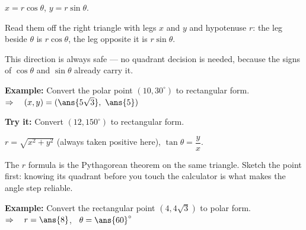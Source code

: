 \documentclass[12pt]{article}
\begin{document}


\begin{formulabox}
$x = r\cos\theta$, \qquad $y = r\sin\theta$.\par
Read them off the right triangle with legs $x$ and $y$ and hypotenuse $r$: the leg beside $\theta$ is $r\cos\theta$, the leg opposite it is $r\sin\theta$.\par
This direction is always safe --- no quadrant decision is needed, because the signs of $\cos\theta$ and $\sin\theta$ already carry it.
\end{formulabox}

\begin{examplebox}
\textbf{Example:} \quad Convert the polar point $(10, 30^\circ)$ to rectangular form.
$\Rightarrow\quad (x, y) = (\ans{5\sqrt{3}},\ \ans{5})$
\end{examplebox}

\begin{tryitbox}
\textbf{Try it:} \quad Convert $(12, 150^\circ)$ to rectangular form.\\[2pt]
\end{tryitbox}


\begin{formulabox}
$r = \sqrt{x^2 + y^2}$ \quad (always taken positive here), \qquad $\tan\theta = \dfrac{y}{x}$.\par
The $r$ formula is the Pythagorean theorem on the same triangle. Sketch the point first: knowing its quadrant before you touch the calculator is what makes the angle step reliable.
\end{formulabox}

\begin{examplebox}
\textbf{Example:} \quad Convert the rectangular point $(4, 4\sqrt{3})$ to polar form.
$\Rightarrow\quad r = \ans{8}$, \ $\theta = \ans{60}^\circ$
\end{examplebox}
\end{document}
